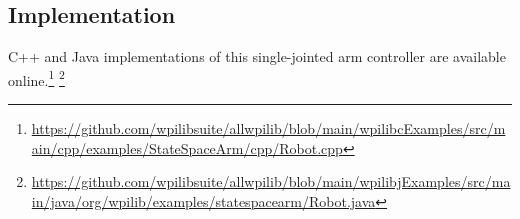 \subsection{Implementation}

C++ and Java implementations of this single-jointed arm controller are available
online.\footnote{\url{https://github.com/wpilibsuite/allwpilib/blob/main/wpilibcExamples/src/main/cpp/examples/StateSpaceArm/cpp/Robot.cpp}}%
\footnote{\url{https://github.com/wpilibsuite/allwpilib/blob/main/wpilibjExamples/src/main/java/org/wpilib/examples/statespacearm/Robot.java}}
